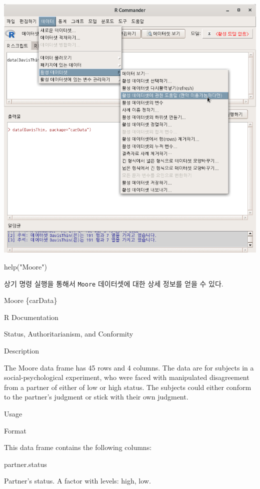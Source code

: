 \documentclass[
]{book}
\newenvironment{Shaded}{\begin{snugshade}}{\end{snugshade}}
\newcommand{\FunctionTok}[1]{\textcolor[rgb]{0.00,0.00,0.00}{#1}}
\newcommand{\NormalTok}[1]{#1}
\newcommand{\StringTok}[1]{\textcolor[rgb]{0.31,0.60,0.02}{#1}}
\begin{document}
\includegraphics{fig/dataset-moore-03.png}

\begin{Shaded}
\begin{Highlighting}[]
\FunctionTok{help}\NormalTok{(}\StringTok{"Moore"}\NormalTok{)}
\end{Highlighting}
\end{Shaded}

상기 명령 실행을 통해서 \texttt{Moore} 데이터셋에 대한 상세 정보를 얻을 수 있다.

Moore \{carData\}

R Documentation

Status, Authoritarianism, and Conformity

Description

The Moore data frame has 45 rows and 4 columns.
The data are for subjects in a social-psychological experiment,
who were faced with manipulated disagreement from a partner of either
of low or high status. The subjects could either conform to the
partner's judgment or stick with their own judgment.

Usage

Format

This data frame contains the following columns:

partner.status

Partner's status. A factor with levels:
high,
low.
\end{document}
